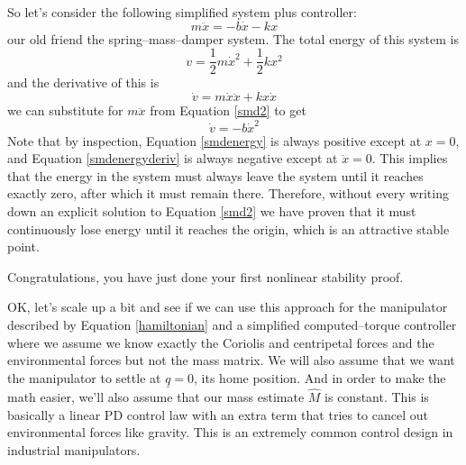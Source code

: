 \documentclass[]{article}
\begin{document}
So let's consider the following simplified system plus controller:
\begin{equation}
 m\ddot{x} = -b\dot{x} - kx \label{smd2}
\end{equation}
our old friend the spring--mass--damper system.
The total energy of this system is
\begin{equation}
 v = \frac{1}{2}m\dot{x}^{2} + \frac{1}{2}kx^{2} \label{smdenergy}
\end{equation}
and the derivative of this is
\begin{displaymath}
 \dot{v} = m\dot{x}\ddot{x}+kx\dot{x}
\end{displaymath}
we can substitute for $m\ddot{x}$ from Equation \ref{smd2} to get
\begin{equation}
 \dot{v} = -b\dot{x}^{2} \label{smdenergyderiv}
\end{equation}
Note that by inspection, Equation \ref{smdenergy} is always positive except at $x=0$, and Equation \ref{smdenergyderiv} is always negative except at $\dot{x}=0$. This implies that the energy in the system must always leave the system until it reaches exactly zero, after which it must remain there. Therefore, without every writing down an explicit solution to Equation \ref{smd2} we have proven that it must continuously lose energy until it reaches the origin, which is an attractive stable point.

Congratulations, you have just done your first nonlinear stability proof.

OK, let's scale up a bit and see if we can use this approach for the manipulator described by Equation \ref{hamiltonian} and a simplified computed--torque controller where we assume we know exactly the Coriolis and centripetal forces and the environmental forces but not the mass matrix. We will also assume that we want the manipulator to settle at $\underline{q}=0$, its home position. And in order to make the math easier, we'll also assume that our mass estimate $\hat{M}$ is constant. This is basically a linear PD control law with an extra term that tries to cancel out environmental forces like gravity. This is an extremely common control design in industrial manipulators.
\end{document}
